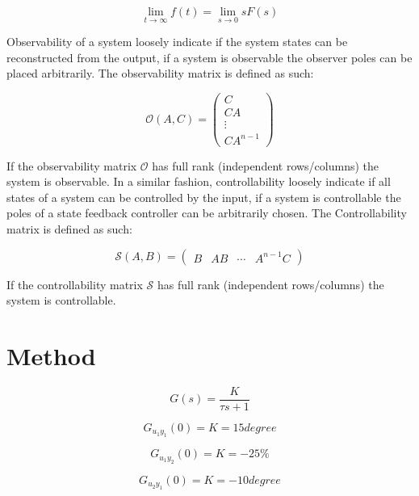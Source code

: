 \documentclass[a4paper, titlepage]{article}
\begin{document}
\begin{equation}
\lim_{t \to \infty} f(t) = \lim_{s \to 0} sF(s)
\end{equation}

Observability of a system loosely indicate if the system states can be reconstructed from the output, if a system is observable the observer poles can be placed arbitrarily.
The observability matrix is defined as such:

\begin{equation}
\mathcal{O}(A,C) = 
\begin{pmatrix}
C \\ CA \\ \vdots \\ CA^{n-1}
\end{pmatrix}
\end{equation}

If the observability matrix $\mathcal{O}$ has full rank (independent rows/columns) the system is observable.
In a similar fashion, controllability loosely indicate if all states of a system can be controlled by the input, if a system is controllable the poles of a state feedback controller can be arbitrarily chosen.
The Controllability matrix is defined as such:

\begin{equation}
\mathcal{S}(A,B) = 
\begin{pmatrix}
B & AB & \cdots & A^{n-1}C
\end{pmatrix}
\end{equation}

If the controllability matrix $\mathcal{S}$ has full rank (independent rows/columns) the system is controllable.

\section{Method}


\begin{equation}
G(s) = \frac{K}{\tau s + 1}
\end{equation}

\begin{equation}
G_{u_1y_1}(0) = K = 15degree
\end{equation}

\begin{equation}
G_{u_1y_2}(0) = K = -25\% 
\end{equation}

\begin{equation}
G_{u_2y_1}(0) = K = -10degree 
\end{equation}
\end{document}
